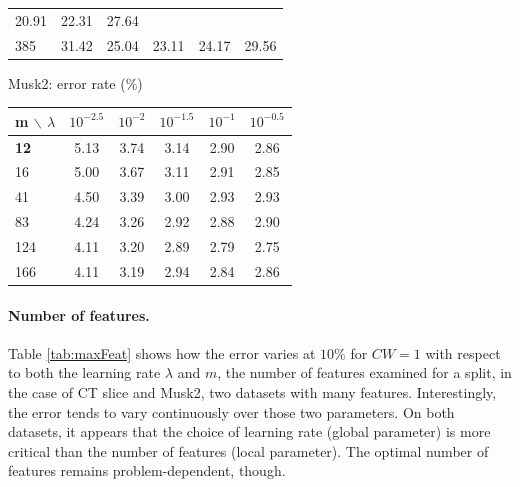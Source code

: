 \documentclass{article}
\begin{document}
\begin{table}[t]
\begin{center}
\begin{footnotesize}
\begin{tabular}{l|ccccc}
\cellcolor[gray]{0.89} 20.91 & \cellcolor[gray]{0.83} 22.31 & 
\cellcolor[gray]{0.58} 27.64 \\
385 & \cellcolor[gray]{0.40} 31.42 & \cellcolor[gray]{0.70} 25.04 & 
\cellcolor[gray]{0.79} 23.11 & \cellcolor[gray]{0.74} 24.17 & 
\cellcolor[gray]{0.49} 29.56 \\
\hline
\end{tabular}
\par
Musk2: error rate ($\%$)\\
\begin{tabular}{l|ccccc}
\hline
m $\backslash$ $\lambda$  &  $10^{-2.5}$ & $10^{-2}$ & $10^{-1.5}$ & 
$10^{-1}$ & $10^{-0.5}$ \\
\hline
{\bf 12} & \cellcolor[gray]{0.40} 5.13 & \cellcolor[gray]{0.75} 3.74 & 
\cellcolor[gray]{0.90} 3.14 & \cellcolor[gray]{0.96} 2.90 & 
\cellcolor[gray]{0.97} 2.86 \\
16 & \cellcolor[gray]{0.43} 5.00 & \cellcolor[gray]{0.77} 3.67 & 
\cellcolor[gray]{0.91} 3.11 & \cellcolor[gray]{0.96} 2.91 & 
\cellcolor[gray]{0.97} 2.85 \\
41 & \cellcolor[gray]{0.56} 4.50 & \cellcolor[gray]{0.84} 3.39 & 
\cellcolor[gray]{0.94} 3.00 & \cellcolor[gray]{0.95} 2.93 & 
\cellcolor[gray]{0.96} 2.93 \\
83 & \cellcolor[gray]{0.62} 4.24 & \cellcolor[gray]{0.87} 3.26 & 
\cellcolor[gray]{0.96} 2.92 & \cellcolor[gray]{0.97} 2.88 & 
\cellcolor[gray]{0.96} 2.90 \\
124 & \cellcolor[gray]{0.66} 4.11 & \cellcolor[gray]{0.89} 3.20 & 
\cellcolor[gray]{0.96} 2.89 & \cellcolor[gray]{0.99} 2.79 & 
\cellcolor[gray]{1.00} 2.75 \\
166 & \cellcolor[gray]{0.66} 4.11 & \cellcolor[gray]{0.89} 3.19 & 
\cellcolor[gray]{0.95} 2.94 & \cellcolor[gray]{0.98} 2.84 & 
\cellcolor[gray]{0.97} 2.86 \\
\hline
\end{tabular}
\end{footnotesize}
\end{center}
\vskip -0.2in
\end{table}

\paragraph{Number of features.}
Table \ref{tab:maxFeat} shows how the error varies at $10\%$ for $CW=1$ with 
respect to both the learning rate $\lambda$ and $m$, the number of features 
examined for a split, in the case of CT slice and Musk2, two datasets with many 
features.
Interestingly, the error tends to vary continuously over those two parameters. 
On both datasets, it appears that the choice of learning rate (global 
parameter) is more critical than the number of features (local parameter). The 
optimal number of features remains problem-dependent, though. 
\end{document}
